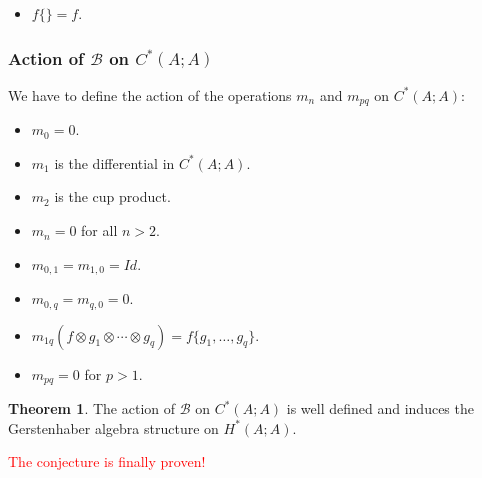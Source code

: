 \documentclass{beamer}
\theoremstyle{definition}
\newtheorem{teorema}{Theorem}
\begin{document}
\begin{frame}
\begin{itemize}
		\item<2-> $f\{\}=f$.
	\end{itemize}
\end{frame}

\begin{frame}
\frametitle{Action of $\mathcal{B}$ on $C^*(A;A)$}
We have to define the action of the operations $m_n$ and $m_{pq}$ on $C^*(A;A)$:

\begin{itemize}
	\item<2-> $m_0=0$.
	\item<3->  $m_1$ is the differential in $C^*(A;A)$.
	\item<4-> $m_2$ is the cup product.
	\item<5-> $m_n=0$ for all $n>2$. 
	\item<6-> $m_{0,1}=m_{1,0}=Id$.
	\item<7-> $m_{0,q}=m_{q,0}=0$.
	\item<8-> $m_{1q}(f\otimes g_1\otimes\cdots\otimes g_q)=f\{g_1,\dots, g_q\}$.
	\item<9-> $m_{pq}=0$ for $p>1$.
\end{itemize}

\end{frame}

\begin{frame}
	\begin{teorema}
		The action of $\mathcal{B}$ on $C^*(A;A)$ is well defined and induces the Gerstenhaber algebra structure on $H^*(A;A)$. 
	\end{teorema}\pause

\textcolor{red}{The conjecture is finally proven!}
\end{frame}
\end{document}
